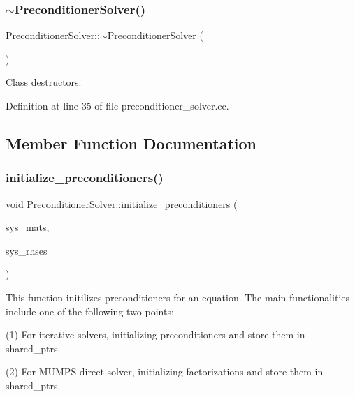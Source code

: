 \subsubsection{\texorpdfstring{$\sim$\+Preconditioner\+Solver()}{~PreconditionerSolver()}}
{\footnotesize\ttfamily Preconditioner\+Solver\+::$\sim$\+Preconditioner\+Solver (\begin{DoxyParamCaption}{ }\end{DoxyParamCaption})}



Class destructors. 



Definition at line 35 of file preconditioner\+\_\+solver.\+cc.



\subsection{Member Function Documentation}
\mbox{\label{class_preconditioner_solver_adfb504161a00566d8adc3534d58b3611}} 
\subsubsection{\texorpdfstring{initialize\+\_\+preconditioners()}{initialize\_preconditioners()}}
{\footnotesize\ttfamily void Preconditioner\+Solver\+::initialize\+\_\+preconditioners (\begin{DoxyParamCaption}\item[{std\+::vector$<$ P\+E\+T\+Sc\+Wrappers\+::\+M\+P\+I\+::\+Sparse\+Matrix $\ast$$>$ \&}]{sys\+\_\+mats,  }\item[{std\+::vector$<$ P\+E\+T\+Sc\+Wrappers\+::\+M\+P\+I\+::\+Vector $\ast$$>$ \&}]{sys\+\_\+rhses }\end{DoxyParamCaption})}

This function initilizes preconditioners for an equation. The main functionalities include one of the following two points\+:

(1) For iterative solvers, initializing preconditioners and store them in shared\+\_\+ptr\textquotesingle{}s.

(2) For M\+U\+M\+PS direct solver, initializing factorizations and store them in shared\+\_\+ptr\textquotesingle{}s.


